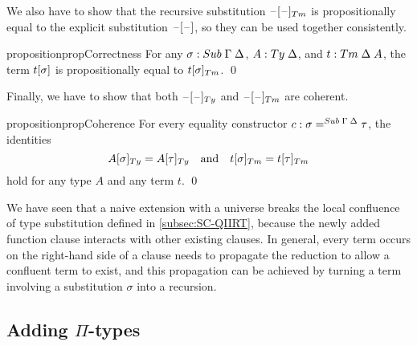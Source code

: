 \documentclass[a4paper,UKenglish,numberwithinsect,cleveref,thm-restate]{lipics-v2021}
\newcommand{\danger}{\marginpar[\hfill\dbend]{\dbend\hfill}}
\begin{document}
We also have to show that the recursive substitution $\subTm{\blank}{\blank}$ is propositionally equal to the explicit substitution ${{\mathord{\hspace{1pt}\text{--}\hspace{1pt}}}[ \mathord{\hspace{1pt}\text{--}\hspace{1pt}} ]}$, so they can be used together consistently.


\begin{restatable}{proposition}{propCorrectness}\label{prop:correctness-1}
  For any $\sigma : \Sub\;\Gamma\;\Delta$, $A : \Ty\;\Delta$, and $t : \Tm\;\Delta\;A$, the term ${{t}[ \sigma ]}$ is propositionally equal to $\subTm{t}{\sigma}$. \qed
\end{restatable}

Finally, we have to show that both $\subTy{\blank}{\blank}$ and $\subTm{\blank}{\blank}$ are coherent.
%
\begin{restatable}{proposition}{propCoherence}\label{prop:coherence-2}
  For every equality constructor $\cc : \sigma =^{\Sub\;\Gamma\;\Delta} \tau$, the identities
  \danger
  \[
    \subTy{A}{\sigma} = \subTy{A}{\tau}
    \quad\text{and}\quad
    \subTm{t}{\sigma} = \subTm{t}{\tau}
  \]
  hold for any type $A$ and any term $t$. \qed
\end{restatable}

\begin{remark}
We have seen that a naive extension with a universe breaks the local confluence of type substitution defined in \cref{subsec:SC-QIIRT}, because the newly added function clause interacts with other existing clauses.
In general, every term occurs on the right-hand side of a clause needs to propagate the reduction to allow a confluent term to exist, and this propagation can be achieved by turning a term involving a substitution $\sigma$ into a recursion.
\end{remark}

\subsection{Adding \texorpdfstring{$\Pi$}{Π}-types} \label{subsec:SC+U+Pi}
\end{document}
